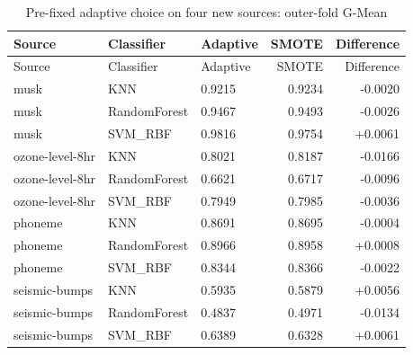 \documentclass[10pt,a4paper]{article}
\begin{document}
\begingroup\small\setlength{\tabcolsep}{4pt}
\begin{longtable}{lllrr}
\caption{Pre-fixed adaptive choice on four new sources: outer-fold G-Mean}\label{tab:s7}\\
\toprule
Source & Classifier & Adaptive & SMOTE & Difference \\
\midrule
\endfirsthead
\toprule
Source & Classifier & Adaptive & SMOTE & Difference \\
\midrule
\endhead
\bottomrule
\endlastfoot
musk & KNN & 0.9215 & 0.9234 & -0.0020 \\
musk & RandomForest & 0.9467 & 0.9493 & -0.0026 \\
musk & SVM\_RBF & 0.9816 & 0.9754 & +0.0061 \\
ozone-level-8hr & KNN & 0.8021 & 0.8187 & -0.0166 \\
ozone-level-8hr & RandomForest & 0.6621 & 0.6717 & -0.0096 \\
ozone-level-8hr & SVM\_RBF & 0.7949 & 0.7985 & -0.0036 \\
phoneme & KNN & 0.8691 & 0.8695 & -0.0004 \\
phoneme & RandomForest & 0.8966 & 0.8958 & +0.0008 \\
phoneme & SVM\_RBF & 0.8344 & 0.8366 & -0.0022 \\
seismic-bumps & KNN & 0.5935 & 0.5879 & +0.0056 \\
seismic-bumps & RandomForest & 0.4837 & 0.4971 & -0.0134 \\
seismic-bumps & SVM\_RBF & 0.6389 & 0.6328 & +0.0061 \\
\end{longtable}
\endgroup
\clearpage
\end{document}
